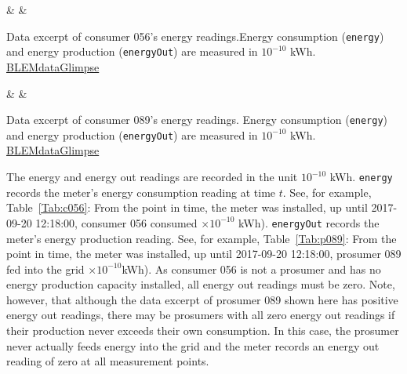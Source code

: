 \begin{table}[htbp]
    {\csvcolii & \csvcoliii & \csvcoliv}%
    \caption[Data excerpt of consumer 056's energy readings]{Data excerpt of consumer 056's energy readings.Energy consumption (\texttt{energy}) and energy production (\texttt{energyOut}) are measured in $10^{-10}$ kWh. \quantnet\href{ }{BLEMdataGlimpse}}
    \label{Tab:c056}
\end{table}

\begin{table}[htbp]
    {\csvcolii & \csvcoliii & \csvcoliv}%
    \caption[Data excerpt of prosumer 089's energy readings]{Data excerpt of consumer 089's energy readings. Energy consumption (\texttt{energy}) and energy production (\texttt{energyOut}) are measured in $10^{-10}$ kWh. \quantnet\href{ }{BLEMdataGlimpse}}
    \label{Tab:p089}
\end{table}

The energy and energy out readings are recorded in the unit $10^{-10}$ kWh. \texttt{energy} records the meter's energy consumption reading at time $t$. See, for example, Table~\ref{Tab:c056}: From the point in time, the meter was installed, up until 2017-09-20 12:18:00, consumer 056 consumed %
{\csvcoliii}$\times 10^{-10}$ kWh). \texttt{energyOut} records the meter's energy production reading. See, for example, Table~\ref{Tab:p089}: From the point in time, the meter was installed, up until 2017-09-20 12:18:00, prosumer 089 fed into the grid %
{\csvcoliii}$\times 10^{-10}$kWh). As consumer 056 is not a prosumer and has no energy production capacity installed, all energy out readings must be zero. Note, however, that although the data excerpt of prosumer 089 shown here has positive energy out readings, there may be prosumers with all zero energy out readings if their production never exceeds their own consumption. In this case, the prosumer never actually feeds energy into the grid and the meter records an energy out reading of zero at all measurement points.

